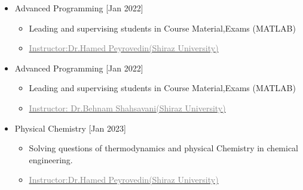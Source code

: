 \documentclass[10pt,a4paper,sans]{moderncv} %
\begin{document}
\begin{itemize}
\begin{itemize}
	
	\end{itemize}
	
	\vspace{0.5em}
	
		\begin{itemize}
			\item {} Advanced Programming  \hfill[Jan 2022]
			\begin{itemize} 
				\item Leading and supervising students in Course Material,Exams (MATLAB)
				\item\href{https://scholar.google.com/citations?hl=en&user=KG__hzQAAAAJ}{\textcolor{gray}{Instructor:Dr.Hamed Peyrovedin(Shiraz University)}}
				
			\end{itemize}
	 		

			
	\end{itemize}
	
	\vspace{0.5em}
	
	\begin{itemize}
     
			\item {} Advanced Programming  \hfill[Jan 2022]
			\begin{itemize} 
				\item Leading and supervising students in Course Material,Exams (MATLAB)
				\item\href{https://scholar.google.com/citations?user=-ppHUiQAAAAJ&hl=en}{\textcolor{gray}{Instructor: Dr.Behnam Shahsavani(Shiraz University)}}
				
	 		
				\newline
			
		\end{itemize}
		
			\vspace{0.5em} 
			
			\item {} Physical Chemistry  \hfill[Jan 2023]
			\begin{itemize} 
				\item Solving questions of thermodynamics and physical Chemistry in chemical engineering.
				\item\href{https://scholar.google.com/citations?hl=en&user=KG__hzQAAAAJ}{\textcolor{gray}{Instructor:Dr.Hamed Peyrovedin(Shiraz University)}}
				

\end{itemize}
\end{itemize}
\end{itemize}
\end{document}
